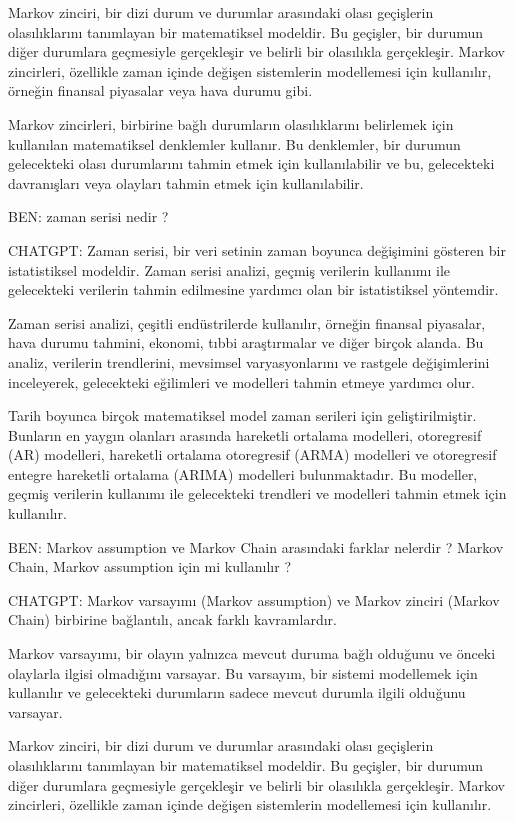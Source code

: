\documentclass[11pt]{article}
\begin{document}
Markov zinciri, bir dizi durum ve durumlar arasındaki olası geçişlerin olasılıklarını tanımlayan bir matematiksel modeldir. Bu geçişler, bir durumun diğer durumlara geçmesiyle gerçekleşir ve belirli bir olasılıkla gerçekleşir. Markov zincirleri, özellikle zaman içinde değişen sistemlerin modellemesi için kullanılır, örneğin finansal piyasalar veya hava durumu gibi.

Markov zincirleri, birbirine bağlı durumların olasılıklarını belirlemek için kullanılan matematiksel denklemler kullanır. Bu denklemler, bir durumun gelecekteki olası durumlarını tahmin etmek için kullanılabilir ve bu, gelecekteki davranışları veya olayları tahmin etmek için kullanılabilir.

BEN: zaman serisi nedir ?

CHATGPT: Zaman serisi, bir veri setinin zaman boyunca değişimini gösteren bir istatistiksel modeldir. Zaman serisi analizi, geçmiş verilerin kullanımı ile gelecekteki verilerin tahmin edilmesine yardımcı olan bir istatistiksel yöntemdir.

Zaman serisi analizi, çeşitli endüstrilerde kullanılır, örneğin finansal piyasalar, hava durumu tahmini, ekonomi, tıbbi araştırmalar ve diğer birçok alanda. Bu analiz, verilerin trendlerini, mevsimsel varyasyonlarını ve rastgele değişimlerini inceleyerek, gelecekteki eğilimleri ve modelleri tahmin etmeye yardımcı olur.

Tarih boyunca birçok matematiksel model zaman serileri için geliştirilmiştir. Bunların en yaygın olanları arasında hareketli ortalama modelleri, otoregresif (AR) modelleri, hareketli ortalama otoregresif (ARMA) modelleri ve otoregresif entegre hareketli ortalama (ARIMA) modelleri bulunmaktadır. Bu modeller, geçmiş verilerin kullanımı ile gelecekteki trendleri ve modelleri tahmin etmek için kullanılır.

BEN: Markov assumption ve Markov Chain arasındaki farklar nelerdir ? Markov Chain, Markov assumption için mi kullanılır ?

CHATGPT: Markov varsayımı (Markov assumption) ve Markov zinciri (Markov Chain) birbirine bağlantılı, ancak farklı kavramlardır.

Markov varsayımı, bir olayın yalnızca mevcut duruma bağlı olduğunu ve önceki olaylarla ilgisi olmadığını varsayar. Bu varsayım, bir sistemi modellemek için kullanılır ve gelecekteki durumların sadece mevcut durumla ilgili olduğunu varsayar.

Markov zinciri, bir dizi durum ve durumlar arasındaki olası geçişlerin olasılıklarını tanımlayan bir matematiksel modeldir. Bu geçişler, bir durumun diğer durumlara geçmesiyle gerçekleşir ve belirli bir olasılıkla gerçekleşir. Markov zincirleri, özellikle zaman içinde değişen sistemlerin modellemesi için kullanılır.
\end{document}
